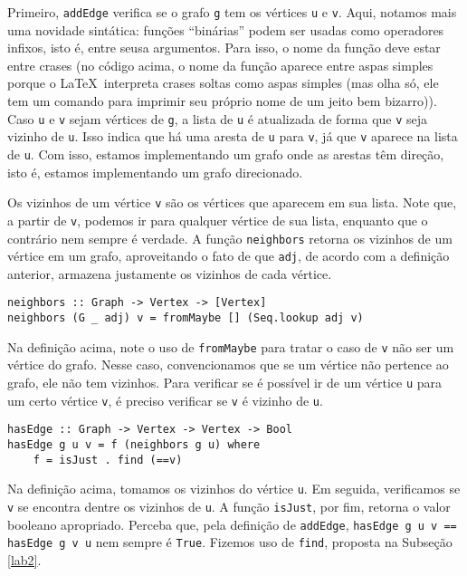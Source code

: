 \documentclass[a4paper]{article}
\begin{document}
Primeiro, \texttt{addEdge} verifica se o grafo \texttt{g} tem os vértices \texttt{u} e \texttt{v}.
Aqui, notamos mais uma novidade sintática: funções ``binárias'' podem ser usadas como operadores infixos, isto é, entre seusa argumentos.
Para isso, o nome da função deve estar entre crases (no código acima, o nome da função aparece entre aspas simples porque o \LaTeX\, interpreta crases soltas como aspas simples (mas olha só, ele tem um comando para imprimir seu próprio nome de um jeito bem bizarro)).
Caso \texttt{u} e \texttt{v} sejam vértices de \texttt{g}, a lista de \texttt{u} é atualizada de forma que \texttt{v} seja vizinho de \texttt{u}.
Isso indica que há uma aresta de \texttt{u} para \texttt{v}, já que \texttt{v} aparece na lista de \texttt{u}.
Com isso, estamos implementando um grafo onde as arestas têm direção, isto é, estamos implementando um grafo direcionado.

Os vizinhos de um vértice \texttt{v} são os vértices que aparecem em sua lista.
Note que, a partir de \texttt{v}, podemos ir para qualquer vértice de sua lista, enquanto que o contrário nem sempre é verdade.
A função \texttt{neighbors} retorna os vizinhos de um vértice em um grafo, aproveitando o fato de que \texttt{adj}, de acordo com a definição anterior, armazena justamente os vizinhos de cada vértice.

\begin{verbatim}
neighbors :: Graph -> Vertex -> [Vertex]
neighbors (G _ adj) v = fromMaybe [] (Seq.lookup adj v)
\end{verbatim}

Na definição acima, note o uso de \texttt{fromMaybe} para tratar o caso de \texttt{v} não ser um vértice do grafo.
Nesse caso, convencionamos que se um vértice não pertence ao grafo, ele não tem vizinhos.
Para verificar se é possível ir de um vértice \texttt{u} para um certo vértice \texttt{v}, é preciso verificar se \texttt{v} é vizinho de \texttt{u}.

\begin{verbatim}
hasEdge :: Graph -> Vertex -> Vertex -> Bool
hasEdge g u v = f (neighbors g u) where
	f = isJust . find (==v)
\end{verbatim}

Na definição acima, tomamos os vizinhos do vértice \texttt{u}.
Em seguida, verificamos se \texttt{v} se encontra dentre os vizinhos de \texttt{u}.
A função \texttt{isJust}, por fim, retorna o valor booleano apropriado.
Perceba que, pela definição de \texttt{addEdge}, \mbox{\texttt{hasEdge g u v == hasEdge g v u}} nem sempre é \texttt{True}.
Fizemos uso de \texttt{find}, proposta na Subseção \ref{lab2}.
\end{document}
